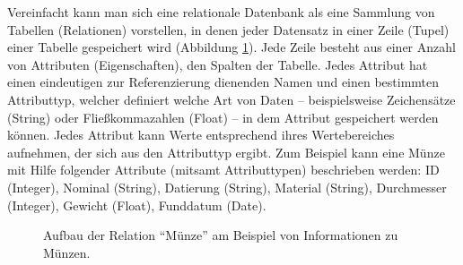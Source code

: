 Vereinfacht kann man sich eine relationale Datenbank als eine Sammlung von Tabellen (Relationen) vorstellen, in denen jeder Datensatz in einer Zeile (Tupel) einer Tabelle gespeichert wird (Abbildung \ref{abb:datenbanken-relation}). Jede Zeile besteht aus einer Anzahl von Attributen (Eigenschaften), den Spalten der Tabelle. Jedes Attribut hat einen eindeutigen zur Referenzierung dienenden Namen und einen bestimmten Attributtyp, welcher definiert welche Art von Daten -- beispielsweise Zeichensätze (String) oder Fließkommazahlen (Float) -- in dem Attribut gespeichert werden können. Jedes Attribut kann Werte entsprechend ihres Wertebereiches aufnehmen, der sich aus den Attributtyp ergibt. Zum Beispiel kann eine Münze mit Hilfe folgender Attribute (mitsamt Attributtypen) beschrieben werden: ID (Integer), Nominal (String), Datierung (String), Material (String), Durchmesser (Integer), Gewicht (Float), Funddatum (Date). 

\begin{figure}[h!tb]
\begin{center}
\scriptsize
{}%
\end{center}
  \caption{Aufbau der Relation "`Münze"' am Beispiel von Informationen zu Münzen.}
\label{abb:datenbanken-relation}
\end{figure}


